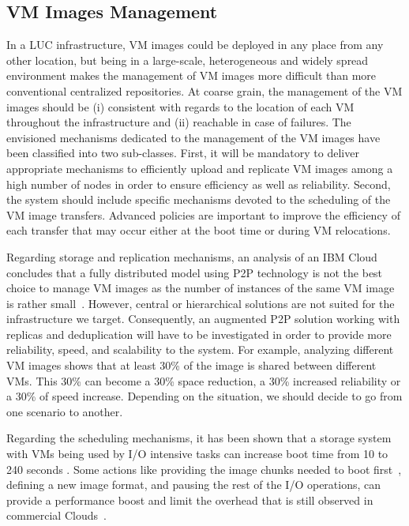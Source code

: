 \subsection{VM Images Management}

In a LUC infrastructure, VM images could be deployed in any place from any
other location, but being in a large-scale, heterogeneous and widely spread
environment makes the management of VM images more difficult than more
conventional  centralized repositories.  
At coarse grain, the management of the VM images should be (i) consistent
with regards to the location of each VM throughout the \discovery infrastructure and
(ii) reachable in case of failures.
%
The envisioned mechanisms dedicated to the management of the VM images have been
classified into two sub-classes.
%
First, it will be mandatory to deliver appropriate mechanisms to efficiently
upload and replicate VM images among a high number of nodes in order to ensure
efficiency as well as reliability.  Second, the \discovery system should 
include specific mechanisms devoted to the scheduling of the VM image
transfers. Advanced policies are important to improve the efficiency of each
transfer that may occur either at the boot time or during VM relocations. 

Regarding storage and replication mechanisms,  an analysis of an IBM Cloud concludes
that a fully distributed model using P2P technology is not the best choice to manage VM images as the
number of instances of the same VM image is rather small~\cite{peng:2012}. However, central or
hierarchical solutions are not suited for the infrastructure we target.
Consequently, an augmented P2P solution working with replicas and
deduplication will have to be investigated in order to provide more
reliability, speed, and scalability to the system. For example, analyzing
different VM images shows that at least 30\% of the image is shared between
different VMs. This 30\% can become a 30\% space reduction, a
30\% increased reliability or a 30\% of speed increase. Depending on the
situation, we should decide to go from one scenario to another. 

Regarding the scheduling mechanisms, it has been shown that a storage system with VMs being used by I/O intensive tasks 
can increase boot time from 10 to 240 seconds \cite{tan:2008}. Some actions like providing the
image chunks needed to boot first~\cite{tang:2011}, defining a new
image format, and pausing the rest of the I/O operations, can provide a
performance boost and limit the overhead that is still observed in commercial
Clouds~\cite{mao:2012}. 

